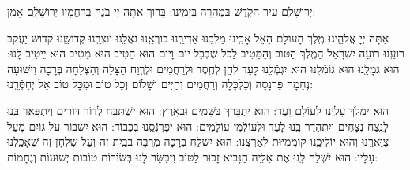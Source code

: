 \documentclass[a4paper, twoside, openany, parskip=half, 10pt]{article}
\begin{document}
\begin{multicols}{3}
\begin{sometimes}
\end{sometimes}

 יְרוּשָׁלַֽםִ עִיר הַקֹּֽדֶשׁ בִּמְהֵרָה בְּיָמֵֽינוּ: בָּרוּךְ אַתָּה יְיָ בֹּֽנֶה בְרַחֲמָיו יְרוּשָׁלָֽםִ אָמֵן:

%
%
%
%
%
%
%
%


 אַתָּה יְיָ אֱלֹהֵֽינוּ מֶֽלֶךְ הָעוֹלָם הָאֵל אָבִֽינוּ מַלְכֵּֽנוּ אַדִּירֵֽנוּ בּוֹרְֿאֵֽנוּ גֹאֲלֵֽנוּ יוֹצְֿרֵֽנוּ קְדוֹשֵֽׁנוּ קְדוֹשׁ יַעֲקֹב רוֹעֵֽנוּ רוֹעֵה יִשְׂרָאֵל הַמֶּֽלֶךְ הַטּוֹב וְהַמֵּטִיב לַכֹּל שֶׁבְּכָל יוֹם וָיוֹם הוּא הֵטִיב הוּא מֵטִיב הוּא יֵיטִיב לָֽנוּ: הוּא גְמָלָֽנוּ הוּא גוֹמְֿלֵנוּ הוּא יִגְמְֿלֵנוּ לָעַד לְחֵן לְחֶֽסֶד וּלְרַחֲמִים וּלְרֶֽוַח הַצָּלָה וְהַצְלָחָה בְּרָכָה וִישׁוּעָה נֶחָמָה פַּרְנָסָה וְכַלְכָּלָה וְרַחֲמִים וְחַיִּים וְשָׁלוֹם וְכָל טוֹב וּמִכָּל טוֹב אַל יְחַסְּֿרֵֽנוּ: 


 הוּא יִמְלֹךְ עָלֵֽינוּ לְעוֹלָם וָעֶד: 
	 הוּא יִתְבָּרַךְ בַּשָּׁמַֽיִם וּבָאָֽרֶץ: 
	 הוּא יִשְׁתַּבַּח לְדוֹר דּוֹרִים וְיִתְפָּֽאַר בָּֽנוּ לָנֵֽצַח נְצָחִים 
		 וְיִתְהַדַּר בָּֽנוּ לָעַד וּלְעוֹלְֿמֵי עוֹלָמִים: 
	 הוּא יְפַרְנְֿסֵֽנוּ בְּכָבוֹד: 
	 הוּא יִשְׁבּוֹר עֹל גּוֹיִם מֵעַל צַוָּארֵֽנוּ וְהוּא יוֹלִיכֵֽנוּ קוֹמֲמִיּוּת לְאַרְצֵֽנוּ: 
	 הוּא יִשְׁלַח בְּרָכָה מְרֻבָּה בְּבַֽיִת זֶה וְעַל שֻׁלְחָן זֶה שֶׁאָכַֽלְנוּ עָלָיו: 
 הוּא יִשְׁלַח לָֽנוּ אֶת אֵלִיָּֽה הַנָּבִיא זָכוּר לַטּוֹב וִיבַשֵּׂר לָנוּ בְּשׂוֹרוֹת טוֹבוֹת יְשׁוּעוֹת וְנֶחָמוֹת:



\end{multicols}
\end{document}
